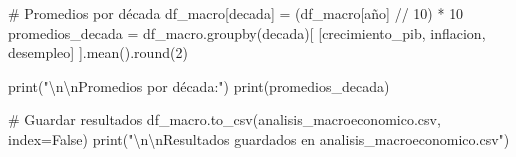 \documentclass[
  doc,
  floatsintext,
  longtable,
  a4paper,
  nolmodern,
  notxfonts,
  notimes,
  12pt,
  colorlinks=true,linkcolor=blue,citecolor=blue,urlcolor=blue]{apa7}
\newenvironment{Shaded}{\begin{snugshade}}{\end{snugshade}}
\newcommand{\BuiltInTok}[1]{\textcolor[rgb]{0.00,0.23,0.31}{#1}}
\newcommand{\CharTok}[1]{\textcolor[rgb]{0.13,0.47,0.30}{#1}}
\newcommand{\CommentTok}[1]{\textcolor[rgb]{0.37,0.37,0.37}{#1}}
\newcommand{\DecValTok}[1]{\textcolor[rgb]{0.68,0.00,0.00}{#1}}
\newcommand{\NormalTok}[1]{\textcolor[rgb]{0.00,0.23,0.31}{#1}}
\newcommand{\OperatorTok}[1]{\textcolor[rgb]{0.37,0.37,0.37}{#1}}
\newcommand{\StringTok}[1]{\textcolor[rgb]{0.13,0.47,0.30}{#1}}
\newcommand{\VariableTok}[1]{\textcolor[rgb]{0.07,0.07,0.07}{#1}}
\begin{document}
\begin{Shaded}
\begin{Highlighting}[]
\CommentTok{\# Promedios por década}
\NormalTok{df\_macro[}\StringTok{\textquotesingle{}decada\textquotesingle{}}\NormalTok{] }\OperatorTok{=}\NormalTok{ (df\_macro[}\StringTok{\textquotesingle{}año\textquotesingle{}}\NormalTok{] }\OperatorTok{//} \DecValTok{10}\NormalTok{) }\OperatorTok{*} \DecValTok{10}
\NormalTok{promedios\_decada }\OperatorTok{=}\NormalTok{ df\_macro.groupby(}\StringTok{\textquotesingle{}decada\textquotesingle{}}\NormalTok{)[}
\NormalTok{    [}\StringTok{\textquotesingle{}crecimiento\_pib\textquotesingle{}}\NormalTok{, }\StringTok{\textquotesingle{}inflacion\textquotesingle{}}\NormalTok{, }\StringTok{\textquotesingle{}desempleo\textquotesingle{}}\NormalTok{]}
\NormalTok{].mean().}\BuiltInTok{round}\NormalTok{(}\DecValTok{2}\NormalTok{)}

\BuiltInTok{print}\NormalTok{(}\StringTok{"}\CharTok{\textbackslash{}n\textbackslash{}n}\StringTok{Promedios por década:"}\NormalTok{)}
\BuiltInTok{print}\NormalTok{(promedios\_decada)}

\CommentTok{\# Guardar resultados}
\NormalTok{df\_macro.to\_csv(}\StringTok{\textquotesingle{}analisis\_macroeconomico.csv\textquotesingle{}}\NormalTok{, index}\OperatorTok{=}\VariableTok{False}\NormalTok{)}
\BuiltInTok{print}\NormalTok{(}\StringTok{"}\CharTok{\textbackslash{}n\textbackslash{}n}\StringTok{Resultados guardados en \textquotesingle{}analisis\_macroeconomico.csv\textquotesingle{}"}\NormalTok{)}
\end{Highlighting}
\end{Shaded}
\end{document}
